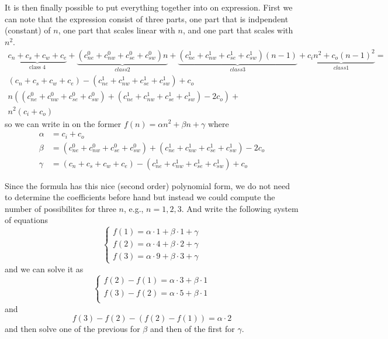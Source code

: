 \documentclass[]{article}
\begin{document}
It is then finally possible to put everything together into on expression. First we can note that the expression consist of three parts, one part that is indpendent (constant) of $n$, one part that scales linear with $n$, and one part that scales with $n^2$.
\begin{gather}
   \underbrace{c_n + c_s + c_w + c_e}_{\text{class 4}} + 
   \underbrace{(c_{ne}^0 + c_{nw}^0 + c_{se}^0 + c_{sw}^0)n}_{class 2} + 
   \underbrace{(c_{ne}^1 + c_{nw}^1 + c_{se}^1 + c_{sw}^1)(n-1)}_{class 3} + 
   \underbrace{c_in^2 + c_o(n-1)^2}_{class 1} = \\
   (c_n + c_s + c_w + c_e) - (c_{ne}^1 + c_{nw}^1 + c_{se}^1 + c_{sw}^1) + c_o \\ \nonumber
   n\left( (c_{ne}^0 + c_{nw}^0 + c_{se}^0 + c_{sw}^0) + (c_{ne}^1 + c_{nw}^1 + c_{se}^1 + c_{sw}^1) - 2c_o \right) + \\ \nonumber
   n^2\left( c_i + c_o \right)
\end{gather}
so we can write in on the former $f(n) = \alpha n^2 + \beta n + \gamma$ where 
\begin{subequations}
    \begin{align}
        \alpha &= c_i + c_o \\ 
        \beta  &= (c_{ne}^0 + c_{nw}^0 + c_{se}^0 + c_{sw}^0) + (c_{ne}^1 + c_{nw}^1 + c_{se}^1 + c_{sw}^1) - 2c_o \\ 
        \gamma &= (c_n + c_s + c_w + c_e) - (c_{ne}^1 + c_{nw}^1 + c_{se}^1 + c_{sw}^1) + c_o
    \end{align}
\end{subequations}


Since the formula has this nice (second order) polynomial form, we do not need to determine the coefficients before hand but instead we could compute the number of possibilites for three $n$, e.g., $n=1,2,3$. And write the following system of equations 
\begin{equation}
    \begin{cases}
        f(1) = \alpha\cdot 1 + \beta \cdot 1 + \gamma \\
        f(2) = \alpha\cdot 4 + \beta \cdot 2 + \gamma \\ 
        f(3) = \alpha\cdot 9 + \beta \cdot 3 + \gamma
    \end{cases}
\end{equation}
and we can solve it as 
\begin{equation}
    \begin{cases}
        f(2) - f(1) = \alpha\cdot 3 + \beta \cdot 1 \\
        f(3) - f(2) = \alpha\cdot 5 + \beta \cdot 1 \\
    \end{cases}
\end{equation}
and 
\begin{equation}
        f(3) - f(2)  - (f(2) - f(1)) = \alpha\cdot 2 
\end{equation}
and then solve one of the previous for $\beta$ and then of the first for $\gamma$. 
\end{document}
